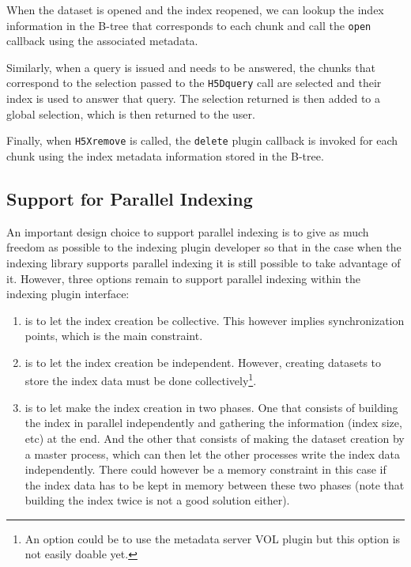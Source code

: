 \documentclass[letterpaper,hyper]{THG_RFC}
\begin{document}
When the dataset is opened and the index reopened, we can lookup the index
information in the B-tree that corresponds to each chunk and call the \texttt{open}
callback using the associated metadata.


Similarly, when a query is issued and needs to be answered, the chunks that
correspond to the selection passed to the \texttt{H5Dquery} call are selected
and their index is used to answer that query. The selection returned is then
added to a global selection, which is then returned to the user.

Finally, when \texttt{H5Xremove} is called, the \texttt{delete} plugin callback is
invoked for each chunk using the index metadata information stored in the B-tree.

\subsection{Support for Parallel Indexing}

An important design choice to support parallel indexing is to give as much
freedom as possible to the indexing plugin developer so that in the case when
the indexing library supports parallel indexing it is still possible to take
advantage of it. However, three options remain to support parallel indexing
within the indexing plugin interface:
\begin{enumerate}
\item is to let the index creation be collective. This however implies synchronization
points, which is the main constraint.
\item is to let the index creation be independent. However, creating datasets to
store the index data must be done collectively\footnote{An option could be to use
the metadata server VOL plugin but this option is not easily doable yet.}.
\item is to let make the index creation in two phases. One that consists of
building the index in parallel independently and gathering the information (index size, etc)
at the end. And the other that consists of making the dataset creation by a master
process, which can then let the other processes write the index data independently.
There could however be a memory constraint in this case if the index data has to
be kept in memory between these two phases (note that building the index twice is not
a good solution either).
\end{enumerate}
\end{document}

